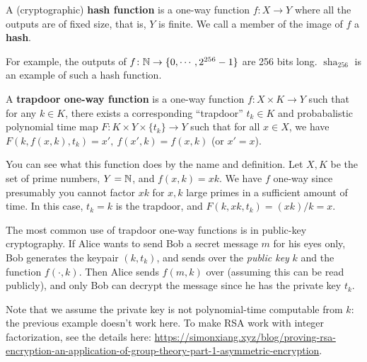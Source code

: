 \begin{definition}[]
    A (cryptographic) \textbf{hash function} is a one-way function $f \colon X \to Y$ where all the outputs are of fixed size, that is, $Y$ is finite. We call a member of the image of $f$ a \textbf{hash}.
\end{definition}
For example, the outputs of $f \colon \mathbb{N} \to \{0,\cdots ,2^{256}-1\} $ are 256 bits long. $\operatorname{sha}_{256}$ is an example of such a hash function.
\begin{definition}[]
    A \textbf{trapdoor one-way function} is a one-way function $f \colon X\times K \to Y$ such that for any $k\in K$, there exists a corresponding ``trapdoor'' $t_k \in K$ and probabalistic polynomial time map $F \colon K\times Y\times \{t_k\}  \to Y $ such that for all $x \in X$, we have $F(k,f(x,k),t_k)=x',\ f(x',k)=f(x,k)$ (or $x'=x$).
\end{definition}
You can see what this function does by the name and definition. Let $X,K$ be the set of prime numbers, $Y=\mathbb{N}$, and $f(x,k)=xk$. We have $f$ one-way since presumably you cannot factor $xk$ for $x,k$ large primes in a sufficient amount of time. In this case, $t_k=k$ is the trapdoor, and  $F(k,xk,t_k)=(xk)/k=x$.

\begin{example}
    The most common use of trapdoor one-way functions is in public-key cryptography. If Alice wants to send Bob a secret message $m$ for his eyes only, Bob generates the keypair $(k, t_k)$, and sends over the \emph{public key} $k$ and the function $f(\cdot ,k)$. Then Alice sends $f(m,k)$ over (assuming this can be read publicly), and only Bob can decrypt the message since he has the private key $t_k$. 
\end{example}
    Note that we assume the private key is not polynomial-time computable from $k$: the previous example doesn't work here. To make RSA work with integer factorization, see the details here: \url{https://simonxiang.xyz/blog/proving-rsa-encryption-an-application-of-group-theory-part-1-asymmetric-encryption}.

